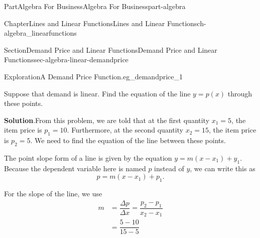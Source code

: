 \documentclass[oneside,10pt,]{tufte-book}
\newcommand{\blocktitlefont}{\relax}
\numberwithin{equation}{chapter}
\newcommand{\amp}{&}
\begin{document}
\begin{partptx}{Part}{Algebra For Business}{}{Algebra For Business}{}{}{part-algebra}
\begin{chapterptx}{Chapter}{Lines and Linear Functions}{}{Lines and Linear Functions}{}{}{ch-algebra_linearfunctions}
\begin{sectionptx}{Section}{Demand Price and Linear Functions}{}{Demand Price and Linear Functions}{}{}{sec-algebra-linear-demandprice}
\begin{exploration}{Exploration}{A Demand Price Function.}{eg_demandprice_1}
\begin{image}{0}{1}{0}{}
{
}%
\end{image}%
Suppose that demand is linear. Find the equation of the line \(y = p(x)\)  through these points.%
\par\smallskip%
\noindent\textbf{\blocktitlefont Solution}.\hypertarget{eg_demandprice_1-3}{}\quad{}From this problem, we are told that at the first quantity \(x_1=5\), the item price is \(p_1 = 10\).  Furthermore, at the second quantity \(x_2=15\), the item price is \(p_2=5\).  We need to find the equation of the line between these points.%
\par
The point slope form of a line is given by the equation \(y = m (x-x_1) + y_1\). Because the dependent variable here is named \(p\) instead of \(y\), we can write this as%
\begin{equation*}
p = m (x- x_1) + p_1\text{.}
\end{equation*}
%
\par
For the slope of the line, we use%
\begin{align*}
m \amp = \dfrac{\Delta p}{\Delta x} = \dfrac{p_2-p_1}{x_2-x_1}\\
\amp = \dfrac{5-10}{15-5}\\

\end{align*}
\end{exploration}
\end{sectionptx}
\end{chapterptx}
\end{partptx}
\end{document}
